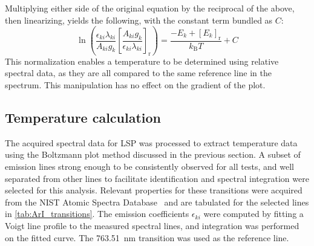             Multiplying either side of the original equation by the reciprocal of the above, then linearizing, yields the following, with the constant term bundled as $C$:
            \begin{equation}
                \ln{\left(\frac{\epsilon_{ki}\lambda_{ki}}{A_{ki}g_k}\left[\frac{A_{ki}g_k}{\epsilon_{ki}\lambda_{ki}}\right]_\mathrm{r}\right)} = \frac{-E_k+[E_k]_\mathrm{r}}{k_\mathrm{B}T} + C
            \end{equation}
            This normalization enables a temperature to be determined using relative spectral data, as they are all compared to the same reference line in the spectrum. This manipulation has no effect on the gradient of the plot.

        \subsection{Temperature calculation}
            The acquired spectral data for LSP was processed to extract temperature data using the Boltzmann plot method discussed in the previous section. A subset of emission lines strong enough to be consistently observed for all tests, and well separated from other lines to facilitate identification and spectral integration were selected for this analysis. Relevant properties for these transitions were acquired from the NIST Atomic Spectra Database~\cite{kramidaNISTAtomicSpectra2022} and are tabulated for the selected lines in \autoref{tab:ArI_transitions}. The emission coefficients $\epsilon_{ki}$ were computed by fitting a Voigt line profile to the measured spectral lines, and integration was performed on the fitted curve. The \qty{763.51}{nm} transition was used as the reference line.

